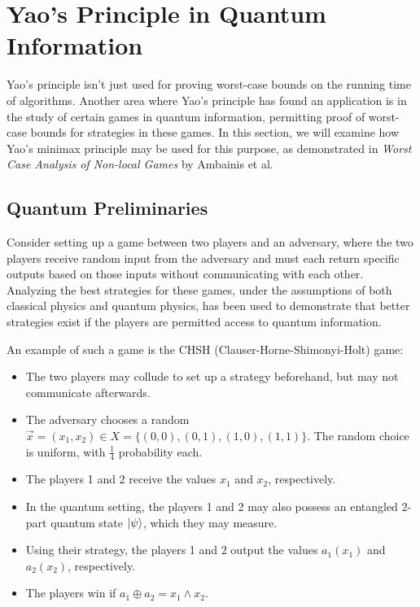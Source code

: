 \section{Yao's Principle in Quantum Information}

Yao's principle isn't just used for proving worst-case bounds on the running time of algorithms. Another area where Yao's principle has found an application is in the study of certain games in quantum information, permitting proof of worst-case bounds for strategies in these games. In this section, we will examine how Yao's minimax principle may be used for this purpose, as demonstrated in \emph{Worst Case Analysis of Non-local Games} by Ambainis et al.


\subsection{Quantum Preliminaries}

Consider setting up a game between two players and an adversary, where the two players receive random input from the adversary and must each return specific outputs based on those inputs without communicating with each other. Analyzing the best strategies for these games, under the assumptions of both classical physics and quantum physics, has been used to demonstrate that better strategies exist if the players are permitted access to quantum information.

An example of such a game is the CHSH (Clauser-Horne-Shimonyi-Holt) game:

\begin{itemize}
\item{The two players may collude to set up a strategy beforehand, but may not communicate afterwards.}
\item{The adversary chooses a random $\vec{x}=(x_1, x_2) \in X=\{(0,0), (0,1), (1,0), (1,1)\}$. The random choice is uniform, with $\frac14$ probability each.}
\item{The players 1 and 2 receive the values $x_1$ and $x_2$, respectively.}
\item{In the quantum setting, the players 1 and 2 may also possess an entangled 2-part quantum state $\ket{\psi}$, which they may measure.}
\item{Using their strategy, the players 1 and 2 output the values $a_1(x_1)$ and $a_2(x_2)$, respectively.}
\item{The players win if $a_1 \oplus a_2 = x_1 \wedge x_2$.}
\end{itemize}


